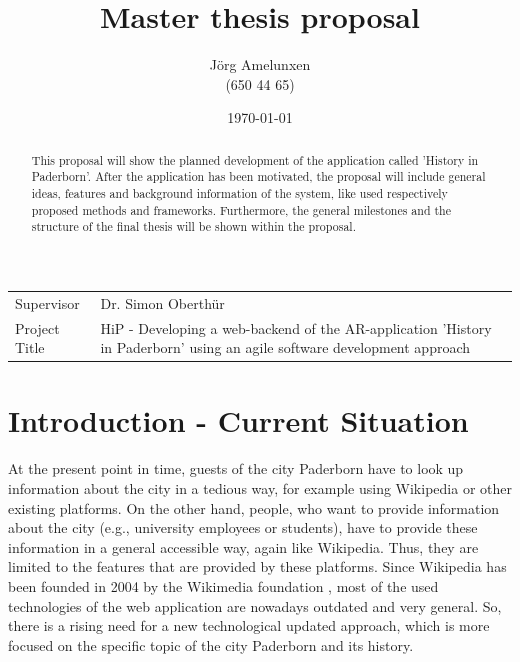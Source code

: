 \documentclass[a4page]{article}
\author{J\"org Amelunxen \\
(650 44 65)
}
\title{Master thesis proposal 
}
\date{\today}
\begin{document}
\maketitle

\newcommand{\stab}[1]{\hspace{.05\textwidth}\rlap{#1}}
\newcommand{\tab}[1]{\hspace{.1\textwidth}\rlap{#1}}

\begin{table}[!th]
\begin{tabular}{l p{}}
Supervisor & Dr. Simon Oberth\"ur \\
Project Title &  HiP - Developing a web-backend of the AR-application 'History in Paderborn' using an agile software development approach
\end{tabular}
\end{table}

\begin{abstract}
This proposal will show the planned development of the application called 'History in Paderborn'. After the application has been motivated, the proposal will include general ideas, features and background information of the system, like used respectively proposed methods and frameworks. Furthermore, the general milestones and the structure of the final thesis will be shown within the proposal. 
\end{abstract}

\section{Introduction - Current Situation}
At the present point in time, guests of the city Paderborn have to look up information about the city in a tedious way, for example using Wikipedia or other existing platforms. On the other hand, people, who want to provide information about the city (e.g., university employees or students), have to provide these information in a general accessible way, again like Wikipedia. Thus, they are limited to the features that are provided by these platforms. Since Wikipedia has been founded in 2004 by the Wikimedia foundation \cite{wikimedia}, most of the used technologies of the web application are nowadays outdated and very general. So, there is a rising need for a new technological updated approach, which is more focused on the specific topic of the city Paderborn and its history. 
\end{document}
